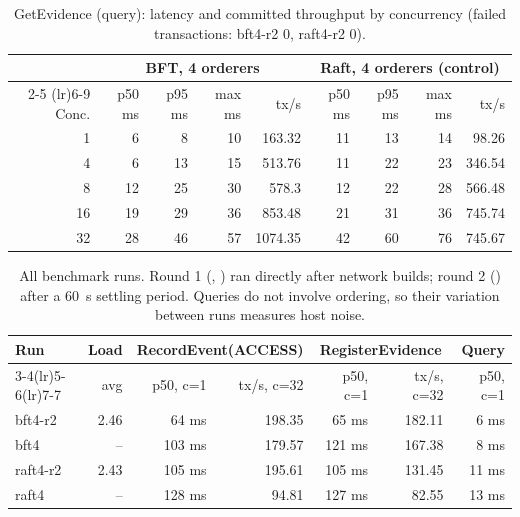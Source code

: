 \begin{table}[htbp]\centering\footnotesize\setlength{\tabcolsep}{4pt}
\begin{tabular}{@{}rrrrrrrrr@{}}
\toprule
 & \multicolumn{4}{c}{BFT, 4 orderers} & \multicolumn{4}{c}{Raft, 4 orderers (control)}\\
\cmidrule(lr){2-5} \cmidrule(lr){6-9}
Conc. & p50 ms & p95 ms & max ms & tx/s & p50 ms & p95 ms & max ms & tx/s\\
\midrule
1 & 6 & 8 & 10 & 163.32 & 11 & 13 & 14 & 98.26\\
4 & 6 & 13 & 15 & 513.76 & 11 & 22 & 23 & 346.54\\
8 & 12 & 25 & 30 & 578.3 & 12 & 22 & 28 & 566.48\\
16 & 19 & 29 & 36 & 853.48 & 21 & 31 & 36 & 745.74\\
32 & 28 & 46 & 57 & 1074.35 & 42 & 60 & 76 & 745.67\\
\bottomrule
\end{tabular}
\caption{GetEvidence (query): latency and committed throughput by concurrency (failed transactions: bft4-r2 0, raft4-r2 0).}
\label{tab:bench-getevidencequery}
\end{table}

\begin{table}[htbp]\centering\small
\begin{tabular}{@{}lrrrrrr@{}}
\toprule
Run & Load & \multicolumn{2}{c}{RecordEvent(ACCESS)} & \multicolumn{2}{c}{RegisterEvidence} & Query\\
\cmidrule(lr){3-4}\cmidrule(lr){5-6}\cmidrule(lr){7-7}
 & avg & p50, c=1 & tx/s, c=32 & p50, c=1 & tx/s, c=32 & p50, c=1\\
\midrule
bft4-r2 & 2.46 & 64 ms & 198.35 & 65 ms & 182.11 & 6 ms\\
bft4 & -- & 103 ms & 179.57 & 121 ms & 167.38 & 8 ms\\
raft4-r2 & 2.43 & 105 ms & 195.61 & 105 ms & 131.45 & 11 ms\\
raft4 & -- & 128 ms & 94.81 & 127 ms & 82.55 & 13 ms\\
\bottomrule
\end{tabular}
\caption{All benchmark runs. Round 1 (, ) ran directly after network builds; round 2 () after a 60~s settling period. Queries do not involve ordering, so their variation between runs measures host noise.}
\label{tab:bench-runs}
\end{table}